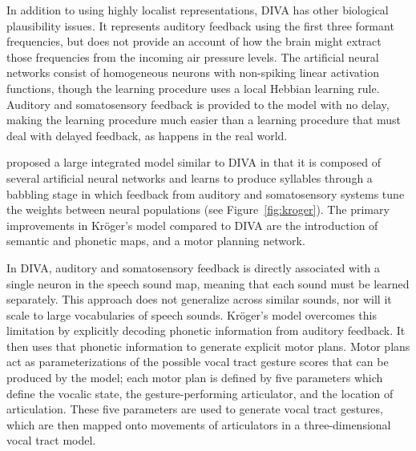 In addition to using highly localist representations,
DIVA has other biological plausibility issues.
It represents auditory feedback using the first
three formant frequencies,
but does not provide an account of
how the brain might extract those
frequencies from the incoming air pressure levels.
The artificial neural networks
consist of homogeneous neurons
with non-spiking linear activation functions,
though the learning procedure
uses a local Hebbian learning rule.
Auditory and somatosensory feedback
is provided to the model with no delay,
making the learning procedure
much easier than a learning procedure
that must deal with delayed feedback,
as happens in the real world.

\citet{kroger2009,kroger2014a,kroger2015} proposed
a large integrated model
similar to DIVA in that
it is composed of
several artificial neural networks
and learns to produce syllables
through a babbling stage
in which feedback from
auditory and somatosensory systems
tune the weights between
neural populations
(see Figure~\ref{fig:kroger}).
The primary improvements in
Kr\"{o}ger's model compared to DIVA
are the introduction of semantic and phonetic maps,
and a motor planning network.


In DIVA, auditory and somatosensory feedback
is directly associated with a single neuron
in the speech sound map,
meaning that each sound must be learned separately.
This approach does not generalize across
similar sounds, nor will it scale
to large vocabularies of speech sounds.
Kr\"{o}ger's model overcomes this limitation
by explicitly decoding phonetic information
from auditory feedback.
It then uses that phonetic information
to generate explicit motor plans.
Motor plans act as parameterizations
of the possible vocal tract gesture scores
that can be produced by the model;
each motor plan is defined by
five parameters which define
the vocalic state,
the gesture-performing articulator,
and the location of articulation.
These five parameters are used
to generate vocal tract gestures,
which are then mapped onto
movements of articulators
in a three-dimensional vocal tract model.

